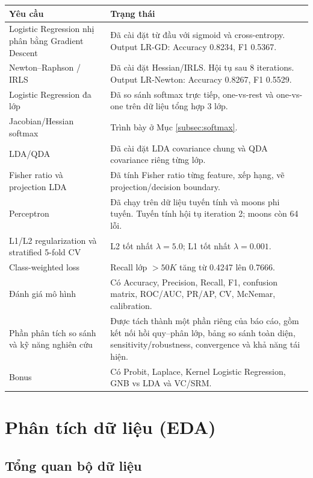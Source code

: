 \documentclass[12pt,a4paper]{article}
\begin{document}
\begin{longtable}{P{0.42\textwidth}P{0.50\textwidth}}
\toprule
\textbf{Yêu cầu} & \textbf{Trạng thái} \\
\midrule
Logistic Regression nhị phân bằng Gradient Descent & Đã cài đặt từ đầu với sigmoid và cross-entropy. Output LR-GD: Accuracy 0.8234, F1 0.5367. \\
Newton--Raphson / IRLS & Đã cài đặt Hessian/IRLS. Hội tụ sau 8 iterations. Output LR-Newton: Accuracy 0.8267, F1 0.5529. \\
Logistic Regression đa lớp & Đã so sánh softmax trực tiếp, one-vs-rest và one-vs-one trên dữ liệu tổng hợp 3 lớp. \\
Jacobian/Hessian softmax & Trình bày ở Mục \ref{subsec:softmax}. \\
LDA/QDA & Đã cài đặt LDA covariance chung và QDA covariance riêng từng lớp. \\
Fisher ratio và projection LDA & Đã tính Fisher ratio từng feature, xếp hạng, vẽ projection/decision boundary. \\
Perceptron & Đã chạy trên dữ liệu tuyến tính và moons phi tuyến. Tuyến tính hội tụ iteration 2; moons còn 64 lỗi. \\
L1/L2 regularization và stratified 5-fold CV & L2 tốt nhất $\lambda=5.0$; L1 tốt nhất $\lambda=0.001$. \\
Class-weighted loss & Recall lớp $>50K$ tăng từ 0.4247 lên 0.7666. \\
Đánh giá mô hình & Có Accuracy, Precision, Recall, F1, confusion matrix, ROC/AUC, PR/AP, CV, McNemar, calibration. \\
Phần phân tích so sánh và kỹ năng nghiên cứu & Được tách thành một phần riêng của báo cáo, gồm kết nối hồi quy--phân lớp, bảng so sánh toàn diện, sensitivity/robustness, convergence và khả năng tái hiện. \\
Bonus & Có Probit, Laplace, Kernel Logistic Regression, GNB vs LDA và VC/SRM. \\
\bottomrule
\end{longtable}

\section{Phân tích dữ liệu (EDA)}
\label{sec:cls_eda}

\subsection{Tổng quan bộ dữ liệu}
\end{document}
